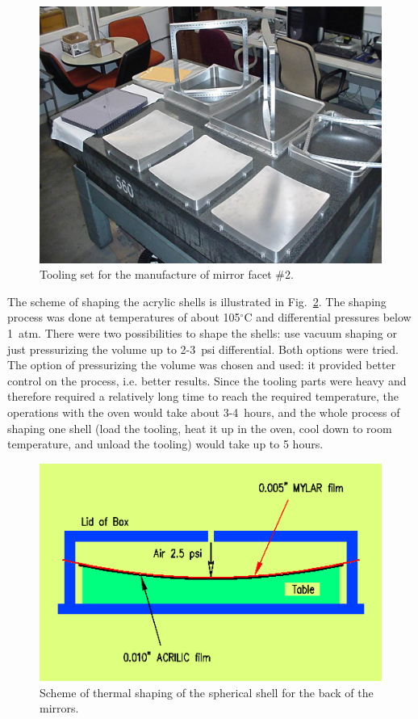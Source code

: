 \begin{figure}[ht]
    \centering
    \includegraphics[width=1.0\linewidth]{images/Tool_on_tbl.jpg}
    \caption{Tooling set for the manufacture of mirror facet \#2.}
    \label{fig:Tool_on_tbl}
\end{figure}

The scheme of shaping the acrylic shells is illustrated in  Fig.~\ref{fig:Shaping_new}. 
The shaping process was
done at temperatures of about 105$^\circ$C and differential pressures below 1~atm. There were two possibilities to
shape the shells: use vacuum shaping or just pressurizing the volume up to 2-3~psi differential. Both options were tried. The option of pressurizing the volume was chosen and used: it provided better control on the process, i.e. better results. Since the tooling parts
were heavy and therefore required a relatively long time to reach the required temperature, the operations with the
oven would take about 3-4~hours, and the whole process of shaping one shell (load the tooling, heat it up in the oven,
cool down to room temperature, and unload the tooling) would take up to 5 hours.

\begin{figure}[ht]
    \centering
    \includegraphics[width=1.0\linewidth]{images/Shaping_new.png}
    \caption{Scheme of thermal shaping of the spherical shell for the back of the mirrors.}
    \label{fig:Shaping_new}
\end{figure}

